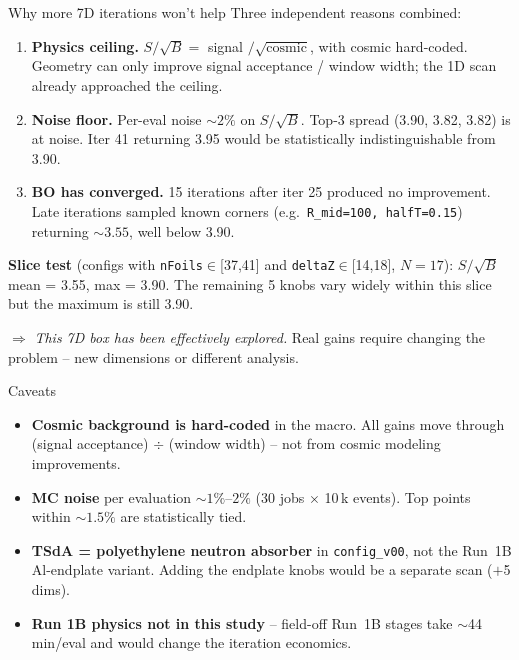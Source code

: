 \documentclass[10pt,aspectratio=169]{beamer}
\begin{document}
\begin{frame}{Why more 7D iterations won't help}
Three independent reasons combined:

\medskip
\begin{enumerate}
\item \textbf{Physics ceiling.} $S/\sqrt{B} = $ signal $/ \sqrt{\mathrm{cosmic}}$, with cosmic
hard-coded. Geometry can only improve signal acceptance / window width;
the 1D scan already approached the ceiling.

\item \textbf{Noise floor.} Per-eval noise $\sim 2\%$ on $S/\sqrt{B}$.
Top-3 spread (3.90, 3.82, 3.82) is at noise. Iter 41 returning 3.95
would be statistically indistinguishable from 3.90.

\item \textbf{BO has converged.} 15 iterations after iter 25 produced no
improvement. Late iterations sampled known corners (e.g.\ \texttt{R\_mid=100, halfT=0.15})
returning $\sim 3.55$, well below 3.90.
\end{enumerate}

\medskip
\textbf{Slice test} (configs with \texttt{nFoils}$\in$[37,41] and \texttt{deltaZ}$\in$[14,18],
$N=17$): $S/\sqrt{B}$ mean = 3.55, max = 3.90.
The remaining 5 knobs vary widely within this slice but the maximum
is still 3.90.

\medskip
$\Rightarrow$ \emph{This 7D box has been effectively explored.}
Real gains require changing the problem -- new dimensions or different
analysis.
\end{frame}

\begin{frame}{Caveats}
\begin{itemize}
\item \textbf{Cosmic background is hard-coded} in the macro. All gains move
      through (signal acceptance) $\div$ (window width) -- not from cosmic
      modeling improvements.
\item \textbf{MC noise} per evaluation $\sim 1\%$--$2\%$ (30 jobs $\times$ 10\,k events).
      Top points within $\sim 1.5\%$ are statistically tied.
\item \textbf{TSdA = polyethylene neutron absorber} in \texttt{config\_v00}, not the
      Run~1B Al-endplate variant. Adding the endplate knobs would be a
      separate scan ($+$5 dims).
\item \textbf{Run 1B physics not in this study} -- field-off Run~1B
      stages take $\sim$44 min/eval and would change the iteration economics.
\end{itemize}
\end{frame}
\end{document}
